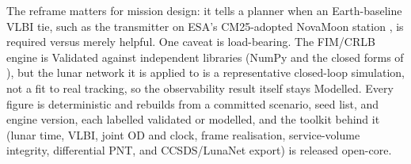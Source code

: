 The reframe matters for mission design: it tells a planner when an Earth-baseline
VLBI tie, such as the transmitter on ESA's CM25-adopted NovaMoon station
\citep{molli2026novamoon}, is required versus merely helpful. One caveat is
load-bearing. The FIM/CRLB engine is Validated against independent libraries
(NumPy and the closed forms of \citealp{kay1993}), but the lunar network it is
applied to is a representative closed-loop simulation, not a fit to real tracking,
so the observability result itself stays Modelled. Every figure is deterministic
and rebuilds from a committed scenario, seed list, and engine version, each
labelled validated or modelled, and the toolkit behind it (lunar time, VLBI,
joint OD and clock, frame realisation, service-volume integrity, differential
PNT, and CCSDS/LunaNet export) is released open-core.
